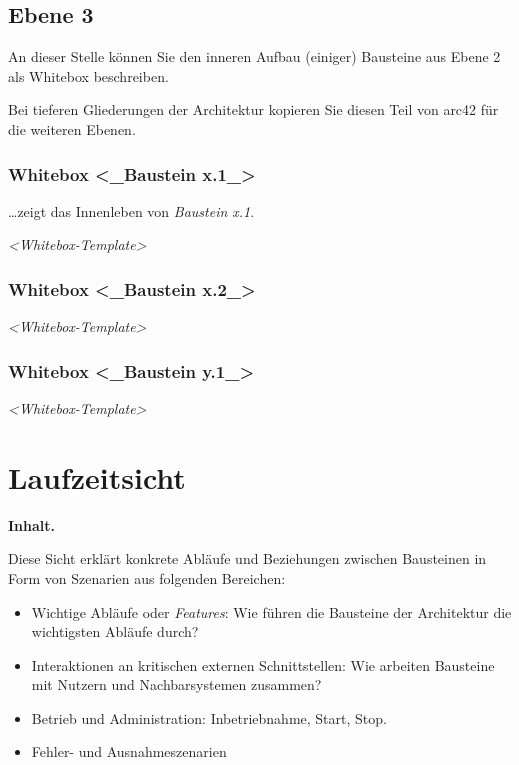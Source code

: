 \documentclass[]{article}
\begin{document}
\subsection{Ebene 3}\label{_ebene_3}

An dieser Stelle können Sie den inneren Aufbau (einiger) Bausteine aus
Ebene 2 als Whitebox beschreiben.

Bei tieferen Gliederungen der Architektur kopieren Sie diesen Teil von
arc42 für die weiteren Ebenen.

\subsubsection{Whitebox \textless{}\_Baustein
x.1\_\textgreater{}}\label{_whitebox_baustein_x_1}

\ldots{}zeigt das Innenleben von \emph{Baustein x.1}.

\emph{\textless{}Whitebox-Template\textgreater{}}

\subsubsection{Whitebox \textless{}\_Baustein
x.2\_\textgreater{}}\label{_whitebox_baustein_x_2}

\emph{\textless{}Whitebox-Template\textgreater{}}

\subsubsection{Whitebox \textless{}\_Baustein
y.1\_\textgreater{}}\label{_whitebox_baustein_y_1}

\emph{\textless{}Whitebox-Template\textgreater{}}

\section{Laufzeitsicht}\label{section-runtime-view}

\textbf{Inhalt.}

Diese Sicht erklärt konkrete Abläufe und Beziehungen zwischen Bausteinen
in Form von Szenarien aus folgenden Bereichen:

\begin{itemize}
\item
  Wichtige Abläufe oder \emph{Features}: Wie führen die Bausteine der
  Architektur die wichtigsten Abläufe durch?
\item
  Interaktionen an kritischen externen Schnittstellen: Wie arbeiten
  Bausteine mit Nutzern und Nachbarsystemen zusammen?
\item
  Betrieb und Administration: Inbetriebnahme, Start, Stop.
\item
  Fehler- und Ausnahmeszenarien
\end{itemize}
\end{document}
